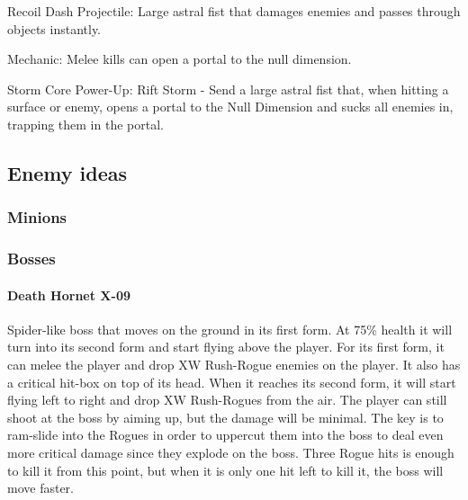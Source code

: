 \documentclass[../Main.tex]{subfiles}
\begin{document}
Recoil Dash Projectile: Large astral fist that damages enemies and passes through objects instantly.

Mechanic: Melee kills can open a portal to the null dimension. 

Storm Core Power-Up: Rift Storm - Send a large astral fist that, when hitting a surface or enemy, opens a portal to the Null Dimension and sucks all enemies in, trapping them in the portal. 

\subsection{Enemy ideas}

\subsubsection{Minions}

\subsubsection{Bosses}

\paragraph{Death Hornet X-09}

Spider-like boss that moves on the ground in its first form. At 75\% health it will turn into its second form and start flying above the player. For its first form, it can melee the player and drop XW Rush-Rogue enemies on the player. It also has a critical hit-box on top of its head. When it reaches its second form, it will start flying left to right and drop XW Rush-Rogues from the air. The player can still shoot at the boss by aiming up, but the damage will be minimal. The key is to ram-slide into the Rogues in order to uppercut them into the boss to deal even more critical damage since they explode on the boss. Three Rogue hits is enough to kill it from this point, but when it is only one hit left to kill it, the boss will move faster. 
\end{document}
